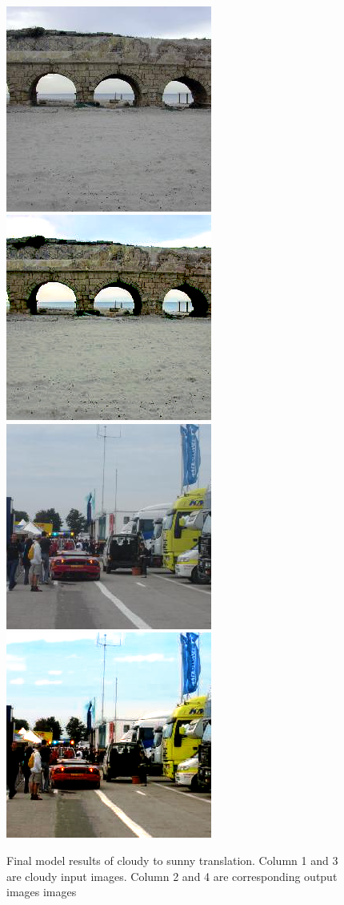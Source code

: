 \documentclass[10pt,twocolumn,letterpaper]{article}
\begin{document}
\begin{figure}[htpb]
  \\[\smallskipamount]
  \includegraphics[width=.23\textwidth]{images/97_A.png}\hfill
  \includegraphics[width=.23\textwidth]{images/97_A2B.png}\hfill
  \hspace{1em}
  \includegraphics[width=.23\textwidth]{images/48_A.png}\hfill
  \includegraphics[width=.23\textwidth]{images/48_A2B.png}\hfill
  \caption{Final model results of cloudy to sunny translation. Column 1 and 3 are cloudy input images. Column 2 and 4 are corresponding output images images}\label{fig:results}
\end{figure}
\end{document}
